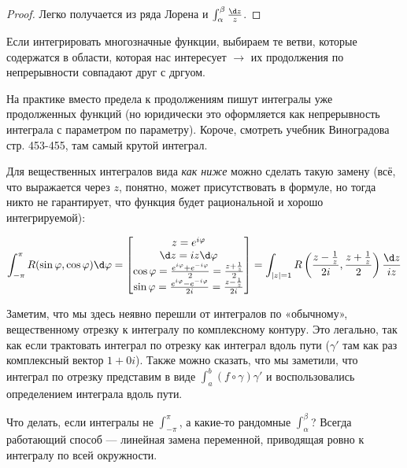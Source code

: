 \documentclass[12pt, a4paper]{article}
\begin{document}
\begin{proof}
  Легко получается из ряда Лорена и $\int_\alpha^\beta \frac{\d z}{z}$.
\end{proof}

Если интегрировать многозначные функции, выбираем те ветви, которые содержатся в области, 
которая нас интересует $→$ их продолжения по непрерывности совпадают друг с дргуом.

На практике вместо предела к продолжениям пишут интегралы уже продолженных функций
(но юридически это оформляется как непрерывность интеграла с параметром по параметру).
Короче, смотреть учебник Виноградова стр. 453-455, там самый крутой интеграл.

Для вещественных интегралов вида \textit{как ниже} можно сделать такую замену
(всё, что выражается через $z$, понятно, может присутствовать в формуле, но тогда никто не гарантирует, что функция будет рациональной и хорошо интегрируемой):

\begin{equation}
  \int_{-\pi}^{\pi} R(\sin \varphi, \cos \varphi) \d \varphi = \begin{bmatrix}
    z = e^{i \varphi} \\ \d z = i z \d \varphi \\
    \cos \varphi = \frac{e^{i \varphi} + e^{- i \varphi}}{2} = \frac{z + \frac{1}{z}}{2} \\
    \sin \varphi = \frac{e^{i \varphi} - e^{- i \varphi}}{2i} = \frac{z - \frac{1}{z}}{2i} \\
  \end{bmatrix} = \int_{|z| = 1} R\left(\frac{z - \frac{1}{z}}{2i}, \frac{z + \frac{1}{z}}{2}\right) \frac{\d z}{i z}
\end{equation}

Заметим, что мы здесь неявно перешли от интегралов по «обычному», вещественному отрезку 
к интегралу по комплексному контуру. Это легально, так как если трактовать интеграл по отрезку как интеграл вдоль пути ($\gamma'$ там как раз комплексный вектор $1 + 0i$).
Также можно сказать, что мы заметили, что интеграл по отрезку представим в виде $\int_a^b (f \circ\gamma) \gamma'$ и воспользовались определением интеграла вдоль пути.

\begin{remark}
  Что делать, если интегралы не $\int_{-\pi}^{\pi}$, а какие-то рандомные $\int_{\alpha}^{\beta}$?
  Всегда работающий способ — линейная замена переменной, приводящая ровно к интегралу по всей окружности.
\end{remark}
\end{document}
